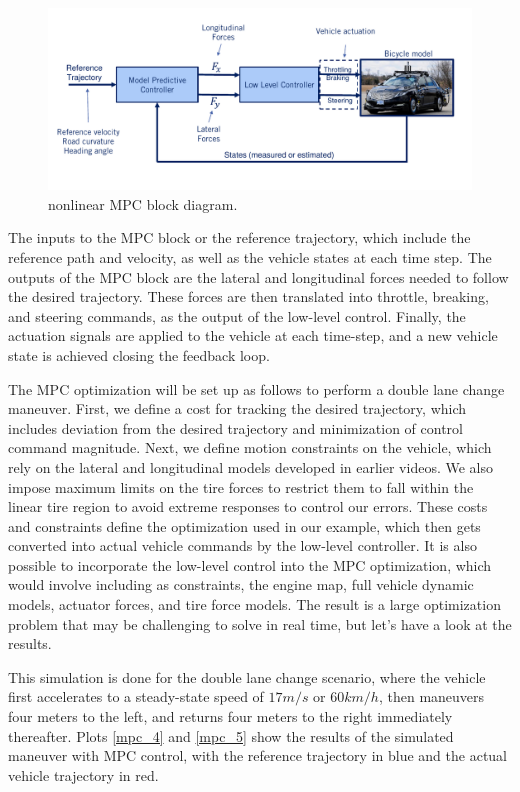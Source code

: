 \begin{figure}[!htb]
\begin{center}
\includegraphics[scale=0.280]{img/lateral_control/mpc_3.jpeg}
\end{center}
\caption{nonlinear MPC block diagram.}
\label{mpc_3}
\end{figure}

The inputs to the MPC block
or the reference trajectory, which include the reference
path and velocity, as well as the vehicle states
at each time step. The outputs of the MPC block are the lateral and longitudinal forces needed to follow
the desired trajectory. These forces are then translated
into throttle, breaking, and steering commands, as the output
of the low-level control. Finally, the actuation signals are applied to the vehicle
at each time-step, and a new vehicle state is achieved
closing the feedback loop. 

The MPC optimization will be set up as follows to perform
a double lane change maneuver. First, we define a cost for
tracking the desired trajectory, which includes deviation from the desired trajectory and minimization of control
command magnitude. Next, we define motion
constraints on the vehicle, which rely on the lateral
and longitudinal models developed in earlier videos. We also impose maximum limits on the tire forces
to restrict them to fall within the linear tire region to avoid extreme responses
to control our errors. These costs and constraints define the optimization used in our example, which then gets converted into actual vehicle commands by
the low-level controller. It is also possible to incorporate the low-level control into
the MPC optimization, which would involve including
as constraints, the engine map, full vehicle dynamic models, actuator forces, and
tire force models. The result is a large
optimization problem that may be challenging
to solve in real time, but let's have a look at the results. 

This simulation is done for
the double lane change scenario, where the vehicle first accelerates
to a steady-state speed of $17m/s$  or $60km/h$, then maneuvers
four meters to the left, and returns four meters to
the right immediately thereafter. Plots \ref{mpc_4} and \ref{mpc_5}
show the results of the simulated maneuver
with MPC control, with the reference trajectory in blue and the actual
vehicle trajectory in red. 

